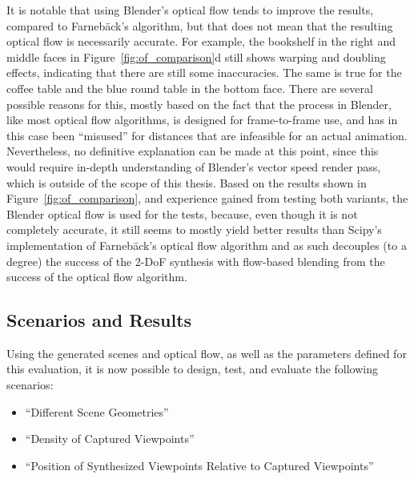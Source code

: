 It is notable that using Blender's optical flow tends to improve the results, compared to Farneb\"ack's algorithm, but that does not mean that the resulting optical flow is necessarily accurate. For example, the bookshelf in the right and middle faces in Figure~\ref{fig:of_comparison}d still shows warping and doubling effects, indicating that there are still some inaccuracies. The same is true for the coffee table and the blue round table in the bottom face. There are several possible reasons for this, mostly based on the fact that the process in Blender, like most optical flow algorithms, is designed for frame-to-frame use, and has in this case been ``misused'' for distances that are infeasible for an actual animation. Nevertheless, no definitive explanation can be made at this point, since this would require in-depth understanding of Blender's vector speed render pass, which is outside of the scope of this thesis. Based on the results shown in Figure~\ref{fig:of_comparison}, and experience gained from testing both variants, the Blender optical flow is used for the tests, because, even though it is not completely accurate, it still seems to mostly yield better results than Scipy's implementation of Farneb\"ack's optical flow algorithm and as such decouples (to a degree) the success of the 2-DoF synthesis with flow-based blending from the success of the optical flow algorithm.


\subsection{Scenarios and Results}
Using the generated scenes and optical flow, as well as the parameters defined for this evaluation, it is now possible to design, test, and evaluate the following scenarios:
\begin{itemize}
  \item ``Different Scene Geometries''
  \item ``Density of Captured Viewpoints''
  \item ``Position of Synthesized Viewpoints Relative to Captured Viewpoints''
\end{itemize}

